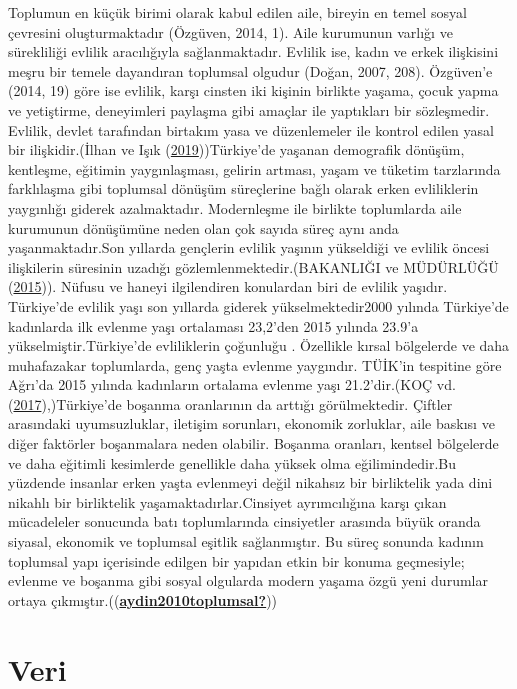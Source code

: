 \documentclass[
  12pt,
]{article}
\begin{document}
Toplumun en küçük birimi olarak kabul edilen aile, bireyin en temel sosyal çevresini oluşturmaktadır (Özgüven, 2014, 1). Aile kurumunun varlığı ve sürekliliği evlilik aracılığıyla sağlanmaktadır. Evlilik ise, kadın ve erkek ilişkisini meşru bir temele dayandıran toplumsal olgudur (Doğan, 2007, 208). Özgüven'e (2014, 19) göre ise evlilik, karşı cinsten iki kişinin birlikte yaşama, çocuk yapma ve yetiştirme, deneyimleri paylaşma gibi amaçlar ile yaptıkları bir sözleşmedir. Evlilik, devlet tarafından birtakım yasa ve düzenlemeler ile kontrol edilen yasal bir ilişkidir.(İlhan ve Işık (\protect\hyperlink{ref-ilhan2019marriage}{2019}))Türkiye'de yaşanan demografik dönüşüm, kentleşme, eğitimin yaygınlaşması, gelirin artması, yaşam ve tüketim tarzlarında farklılaşma gibi toplumsal dönüşüm süreçlerine bağlı olarak erken evliliklerin yaygınlığı giderek azalmaktadır. Modernleşme ile birlikte toplumlarda aile kurumunun dönüşümüne neden olan çok sayıda süreç aynı anda yaşanmaktadır.Son yıllarda gençlerin evlilik yaşının yükseldiği ve evlilik öncesi ilişkilerin süresinin uzadığı gözlemlenmektedir.(BAKANLIĞI ve MÜDÜRLÜĞÜ (\protect\hyperlink{ref-bakanliugi2015turkiye}{2015})). Nüfusu ve haneyi ilgilendiren konulardan biri de evlilik yaşıdır. Türkiye'de evlilik yaşı son yıllarda giderek yükselmektedir2000 yılında Türkiye'de kadınlarda ilk evlenme yaşı ortalaması 23,2'den 2015 yılında 23.9'a yükselmiştir.Türkiye'de evliliklerin çoğunluğu . Özellikle kırsal bölgelerde ve daha muhafazakar toplumlarda, genç yaşta evlenme yaygındır. TÜİK'in tespitine göre Ağrı'da 2015 yılında kadınların ortalama evlenme yaşı 21.2'dir.(KOÇ vd. (\protect\hyperlink{ref-kocc2017development}{2017}),)Türkiye'de boşanma oranlarının da arttığı görülmektedir. Çiftler arasındaki uyumsuzluklar, iletişim sorunları, ekonomik zorluklar, aile baskısı ve diğer faktörler boşanmalara neden olabilir. Boşanma oranları, kentsel bölgelerde ve daha eğitimli kesimlerde genellikle daha yüksek olma eğilimindedir.Bu yüzdende insanlar erken yaşta evlenmeyi değil nikahsız bir birliktelik yada dini nikahlı bir birliktelik yaşamaktadırlar.Cinsiyet ayrımcılığına karşı çıkan mücadeleler sonucunda batı toplumlarında cinsiyetler arasında büyük oranda siyasal, ekonomik ve toplumsal eşitlik sağlanmıştır. Bu süreç sonunda kadının toplumsal yapı içerisinde edilgen bir yapıdan etkin bir konuma geçmesiyle; evlenme ve boşanma gibi sosyal olgularda modern yaşama özgü yeni durumlar ortaya çıkmıştır.((\protect\hyperlink{ref-aydin2010toplumsal}{\textbf{aydin2010toplumsal?}}))

\hypertarget{veri}{%
\section{Veri}\label{veri}}
\end{document}
